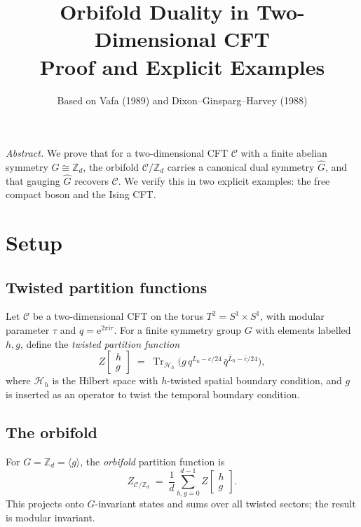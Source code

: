 \documentclass[11pt,a4paper]{article}
\title{Orbifold Duality in Two-Dimensional CFT\\[4pt]
\large Proof and Explicit Examples}
\author{Based on Vafa (1989) and Dixon--Ginsparg--Harvey (1988)}
\date{}
\theoremstyle{plain}
\theoremstyle{definition}
\theoremstyle{remark}
\newcommand{\Zd}{\mathbb{Z}_d}
\newcommand{\Hil}{\mathcal{H}}
\newcommand{\Cft}{\mathcal{C}}
\newcommand{\ii}{\mathrm{i}}
\newcommand{\ee}{\mathrm{e}}
\newcommand{\partfn}[2]{Z\!\begin{bmatrix}#1\\#2\end{bmatrix}}
\newcommand{\Tr}{\operatorname{Tr}}
\begin{document}
\maketitle
\tableofcontents

\bigskip\noindent
\textit{Abstract.}
We prove that for a two-dimensional CFT $\Cft$ with a finite abelian
symmetry $G\cong\Zd$, the orbifold $\Cft/\Zd$ carries a canonical dual
symmetry $\widehat{G}$, and that gauging $\widehat{G}$ recovers $\Cft$.
We verify this in two explicit examples: the free compact boson and the
Ising CFT.

\section{Setup}

\subsection{Twisted partition functions}

Let $\Cft$ be a two-dimensional CFT on the torus $T^2 = S^1 \times S^1$,
with modular parameter $\tau$ and $q = \ee^{2\pi\ii\tau}$.  For a finite
symmetry group $G$ with elements labelled $h, g$, define the
\emph{twisted partition function}
\begin{equation}\label{eq:twisted}
  \partfn{h}{g}
  \;=\;
  \Tr_{\Hil_h}\!\bigl(g\,q^{L_0 - c/24}\,\bar{q}^{\bar{L}_0 - \bar{c}/24}\bigr),
\end{equation}
where $\Hil_h$ is the Hilbert space with $h$-twisted spatial boundary
condition, and $g$ is inserted as an operator to twist the temporal
boundary condition.

\subsection{The orbifold}

For $G = \Zd = \langle g \rangle$, the \emph{orbifold} partition function is
\begin{equation}\label{eq:orbifold}
  Z_{\Cft/\Zd}
  \;=\;
  \frac{1}{d}\sum_{h,g=0}^{d-1}\partfn{h}{g}.
\end{equation}
This projects onto $G$-invariant states and sums over all twisted
sectors; the result is modular invariant.

\end{document}
